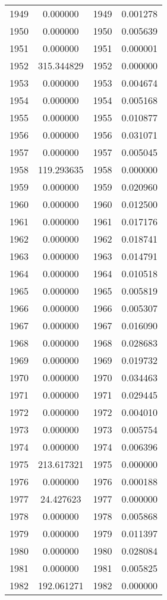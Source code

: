 \documentclass[12pt]{article}
\begin{document}
\begin{longtable}{@{}cccc@{}}
1949 & 0.000000 & 1949 & 0.001278 \\
1950 & 0.000000 & 1950 & 0.005639 \\
1951 & 0.000000 & 1951 & 0.000001 \\
1952 & 315.344829 & 1952 & 0.000000 \\
1953 & 0.000000 & 1953 & 0.004674 \\
1954 & 0.000000 & 1954 & 0.005168 \\
1955 & 0.000000 & 1955 & 0.010877 \\
1956 & 0.000000 & 1956 & 0.031071 \\
1957 & 0.000000 & 1957 & 0.005045 \\
1958 & 119.293635 & 1958 & 0.000000 \\
1959 & 0.000000 & 1959 & 0.020960 \\
1960 & 0.000000 & 1960 & 0.012500 \\
1961 & 0.000000 & 1961 & 0.017176 \\
1962 & 0.000000 & 1962 & 0.018741 \\
1963 & 0.000000 & 1963 & 0.014791 \\
1964 & 0.000000 & 1964 & 0.010518 \\
1965 & 0.000000 & 1965 & 0.005819 \\
1966 & 0.000000 & 1966 & 0.005307 \\
1967 & 0.000000 & 1967 & 0.016090 \\
1968 & 0.000000 & 1968 & 0.028683 \\
1969 & 0.000000 & 1969 & 0.019732 \\
1970 & 0.000000 & 1970 & 0.034463 \\
1971 & 0.000000 & 1971 & 0.029445 \\
1972 & 0.000000 & 1972 & 0.004010 \\
1973 & 0.000000 & 1973 & 0.005754 \\
1974 & 0.000000 & 1974 & 0.006396 \\
1975 & 213.617321 & 1975 & 0.000000 \\
1976 & 0.000000 & 1976 & 0.000188 \\
1977 & 24.427623 & 1977 & 0.000000 \\
1978 & 0.000000 & 1978 & 0.005868 \\
1979 & 0.000000 & 1979 & 0.011397 \\
1980 & 0.000000 & 1980 & 0.028084 \\
1981 & 0.000000 & 1981 & 0.005825 \\
1982 & 192.061271 & 1982 & 0.000000 \\

\end{longtable}
\end{document}
